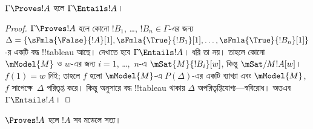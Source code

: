\documentclass[../../../include/open-logic-section]{subfiles}
\begin{document}
\begin{cor}
$\Gamma \Proves !A$ হলে $\Gamma \Entails !A$।
\end{cor}

\begin{proof}
  $\Gamma \Proves !A$ হলে কোনো $!B_1$, \dots, $!B_n \in
  \Gamma$-এর জন্য $\Delta = \{\sFmla{\False}{!A}[1],
  \sFmla{\True}{!B_1}[1], \dots,
  \sFmla{\True}{!B_n}[1]\}$-র একটি বদ্ধ !!{tableau} আছে।
  দেখাতে হবে $\Gamma \Entails !A$। ধরি তা নয়। তাহলে কোনো
  $\mModel{M}$ ও $w$-এর জন্য $i=1$, \dots,~$n$-এ
  $\mSat{M}{!B_i}[w]$, কিন্তু $\mSat/{M}{!A}[w]$।
  $f(1) = w$ নিই; তাহলে $f$ হলো $\mModel{M}$-এ
  $P(\Delta)$-এর একটি ব্যাখ্যা এবং $\mModel{M}$,
  $f$ সাপেক্ষে~$\Delta$ পরিতৃপ্ত করে। কিন্তু
   অনুসারে বদ্ধ !!{tableau}
  থাকায় $\Delta$ অপরিতৃপ্তিযোগ্য—স্ববিরোধ। অতএব
  $\Gamma \Entails !A$।
\end{proof}

\begin{cor}
$\Proves !A$ হলে $!A$ সব মডেলে সত্য।
\end{cor}
\end{document}

